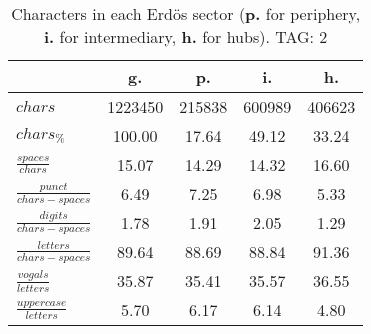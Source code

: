 \begin{table}[h!]
\begin{center}
\begin{tabular}{| l | c | c | c | c |}\hline
 & g. & p. & i. & h. \\\hline
$chars$ & 1223450  & 215838  & 600989  & 406623 \\\hline
$chars_{\%}$ & 100.00  & 17.64  & 49.12  & 33.24 \\\hline
$\frac{spaces}{chars}$ & 15.07  & 14.29  & 14.32  & 16.60 \\\hline
$\frac{punct}{chars-spaces}$ & 6.49  & 7.25  & 6.98  & 5.33 \\\hline
$\frac{digits}{chars-spaces}$ & 1.78  & 1.91  & 2.05  & 1.29 \\\hline
$\frac{letters}{chars-spaces}$ & 89.64  & 88.69  & 88.84  & 91.36 \\\hline
$\frac{vogals}{letters}$ & 35.87  & 35.41  & 35.57  & 36.55 \\\hline
$\frac{uppercase}{letters}$ & 5.70  & 6.17  & 6.14  & 4.80 \\\hline
\end{tabular}
\caption{Characters in each Erd\"os sector ({{\bf p.}} for periphery, {{\bf i.}} for intermediary, 
    {{\bf h.}} for hubs). TAG: 2}
\end{center}
\end{table}
